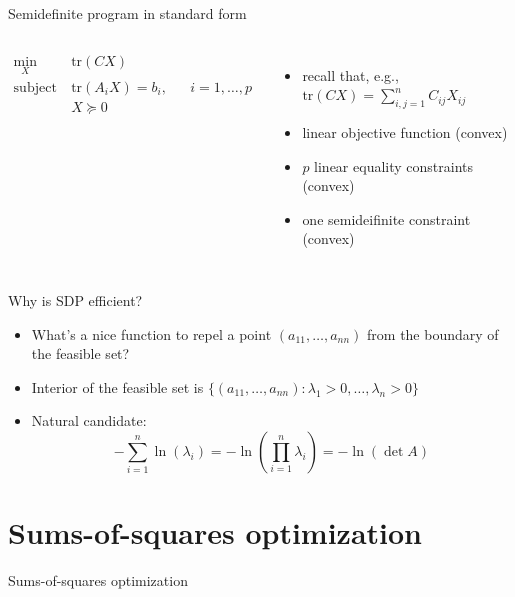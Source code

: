 \documentclass[aspectratio=169]{beamer}
\begin{document}
\begin{frame}{Semidefinite program in standard form}
\begin{columns}
\begin{align*}
\min_{X} \ & \text{tr}(C X) \\
\text{subject to} \ & \text{tr}(A_i X) = b_i, &&  i = 1, \ldots, p \\
& X \succeq 0
\end{align*}
\begin{itemize}
\item
recall that, e.g., $\text{tr}(C X) = \sum_{i,j=1}^n C_{ij} X_{ij}$
\item
linear objective function (convex)
\item
$p$ linear equality constraints (convex)
\item
one semideifinite constraint (convex)
\end{itemize}
\end{columns}
\vspace{5mm}
Why is SDP efficient?
\begin{itemize}
\item
What's a nice function to repel a point $(a_{11},\dots, a_{nn})$ from the boundary of the feasible set?
\item
Interior of the feasible set is $\{ (a_{11},\dots, a_{nn}) : \lambda_1 > 0, \ldots, \lambda_n > 0 \}$
\item
Natural candidate: $$- \sum_{i=1}^n \ln (\lambda_i) = - \ln( \prod_{i=1}^n \lambda_i ) = - \ln (\det A)$$
\end{itemize}
\end{frame}

\section{Sums-of-squares optimization}
\begin{frame}
\huge
\centering
{\color{darkred} Sums-of-squares optimization}
\end{frame}
\end{document}
